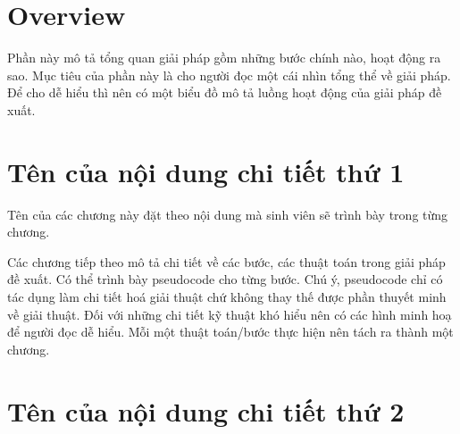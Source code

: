 \section{Overview}
Phần này mô tả tổng quan giải pháp gồm những bước chính nào, hoạt động ra sao. Mục tiêu của phần này là cho người đọc một cái nhìn tổng thể về giải pháp. Để cho dễ hiểu thì nên có một biểu đồ mô tả luồng hoạt động của giải pháp đề xuất. 

\section{Tên của nội dung chi tiết thứ 1}
Tên của các chương này đặt theo nội dung mà sinh viên sẽ trình bày trong từng chương. 

Các chương tiếp theo mô tả chi tiết về các bước, các thuật toán trong giải pháp đề xuất. Có thể trình bày pseudocode cho từng bước. Chú ý, pseudocode chỉ có tác dụng làm chi tiết hoá giải thuật chứ không thay thế được phần thuyết minh về giải thuật. Đối với những chi tiết kỹ thuật khó hiểu nên có các hình minh hoạ để người đọc dễ hiểu. Mỗi một thuật toán/bước thực hiện nên tách ra thành một chương. 

\section{Tên của nội dung chi tiết thứ 2}
